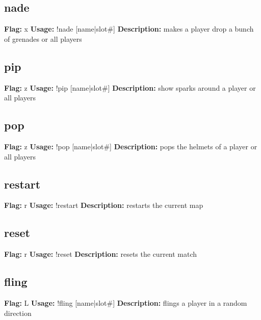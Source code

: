 \subsection{nade}
\textbf{Flag:} \hfill x \linebreak\textbf{Usage:} \hfill !nade [name|slot\#] \linebreak
\textbf{Description:} \hfill makes a player drop a bunch of grenades or all players

\subsection{pip}
\textbf{Flag:} \hfill z \linebreak\textbf{Usage:} \hfill !pip [name|slot\#] \linebreak
\textbf{Description:} \hfill show sparks around a player or all players

\subsection{pop}
\textbf{Flag:} \hfill z \linebreak\textbf{Usage:} \hfill !pop [name|slot\#] \linebreak
\textbf{Description:} \hfill pops the helmets of a player or all players

\subsection{restart}
\textbf{Flag:} \hfill r \linebreak\textbf{Usage:} \hfill !restart  \linebreak
\textbf{Description:} \hfill restarts the current map

\subsection{reset}
\textbf{Flag:} \hfill r \linebreak\textbf{Usage:} \hfill !reset  \linebreak
\textbf{Description:} \hfill resets the current match

\subsection{fling}
\textbf{Flag:} \hfill L \linebreak\textbf{Usage:} \hfill !fling [name|slot\#] \linebreak
\textbf{Description:} \hfill flings a player in a random direction


